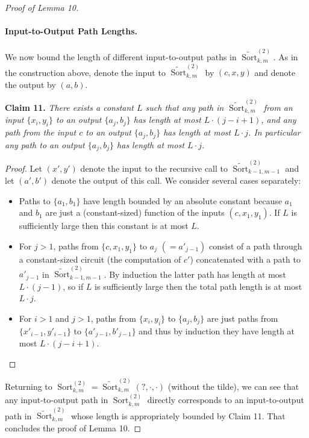 \documentclass[10pt,a4paper]{article}
\newcommand{\Sort}{\operatorname{Sort}}
\newenvironment{originalresult}[1]{\par\medskip\noindent\textbf{#1.}\itshape}{\par\medskip}
\begin{document}
\begin{proof}[Proof of Lemma 10]
\paragraph{Input-to-Output Path Lengths.} We now bound the length of different input-to-output paths in $\widetilde{\Sort}^{(2)}_{k,m}$. As in the construction above, denote the input to $\widetilde{\Sort}^{(2)}_{k,m}$ by $(c,x,y)$ and denote the output by $(a,b)$.
\begin{originalresult}{Claim 11}
There exists a constant $L$ such that any path in $\widetilde{\Sort}^{(2)}_{k,m}$ from an input $\{x_i,y_i\}$ to an output $\{a_j,b_j\}$ has length at most $L\cdot(j-i+1)$, and any path from the input $c$ to an output $\{a_j,b_j\}$ has length at most $L\cdot j$. In particular any path to an output $\{a_j,b_j\}$ has length at most $L\cdot j$.
\end{originalresult}
\begin{proof}
Let $(x',y')$ denote the input to the recursive call to $\widetilde{\Sort}^{(2)}_{k-1,m-1}$ and let $(a',b')$ denote the output of this call. We consider several cases separately:
\begin{itemize}
\item Paths to $\{a_1,b_1\}$ have length bounded by an absolute constant because $a_1$ and $b_1$ are just a (constant-sized) function of the inputs $(c,x_1,y_1)$. If $L$ is sufficiently large then this constant is at most $L$.
\item For $j>1$, paths from $\{c,x_1,y_1\}$ to $a_j$ $(=a'_{j-1})$ consist of a path through a constant-sized circuit (the computation of $c'$) concatenated with a path to $a'_{j-1}$ in $\widetilde{\Sort}^{(2)}_{k-1,m-1}$. By induction the latter path has length at most $L\cdot(j-1)$, so if $L$ is sufficiently large then the total path length is at most $L\cdot j$.
\item For $i>1$ and $j>1$, paths from $\{x_i,y_i\}$ to $\{a_j,b_j\}$ are just paths from $\{x'_{i-1},y'_{i-1}\}$ to $\{a'_{j-1},b'_{j-1}\}$ and thus by induction they have length at most $L\cdot(j-i+1)$.
\end{itemize}
\end{proof}
Returning to $\Sort^{(2)}_{k,m}=\widetilde{\Sort}^{(2)}_{k,m}(?,\cdot,\cdot)$ (without the tilde), we can see that any input-to-output path in $\Sort^{(2)}_{k,m}$ directly corresponds to an input-to-output path in $\widetilde{\Sort}^{(2)}_{k,m}$ whose length is appropriately bounded by Claim 11. That concludes the proof of Lemma 10.
\end{proof}
\end{document}
